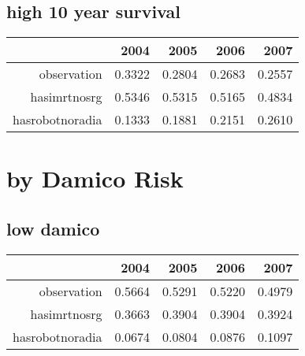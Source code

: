 \documentclass[12pt]{report}
\begin{document}
\subsection{high 10 year survival}
\begin{table}[ht]
\begin{center}
\begin{tabular}{rrrrr}
  \hline
 & 2004 & 2005 & 2006 & 2007 \\ 
  \hline
observation & 0.3322 & 0.2804 & 0.2683 & 0.2557 \\ 
  hasimrtnosrg & 0.5346 & 0.5315 & 0.5165 & 0.4834 \\ 
  hasrobotnoradia & 0.1333 & 0.1881 & 0.2151 & 0.2610 \\ 
   \hline
\end{tabular}
\end{center}
\end{table}


\pagebreak
\section{by Damico Risk}
\subsection{low damico}
\begin{table}[ht]
\begin{center}
\begin{tabular}{rrrrr}
  \hline
 & 2004 & 2005 & 2006 & 2007 \\ 
  \hline
observation & 0.5664 & 0.5291 & 0.5220 & 0.4979 \\ 
  hasimrtnosrg & 0.3663 & 0.3904 & 0.3904 & 0.3924 \\ 
  hasrobotnoradia & 0.0674 & 0.0804 & 0.0876 & 0.1097 \\ 
   \hline
\end{tabular}
\end{center}
\end{table}
\end{document}
